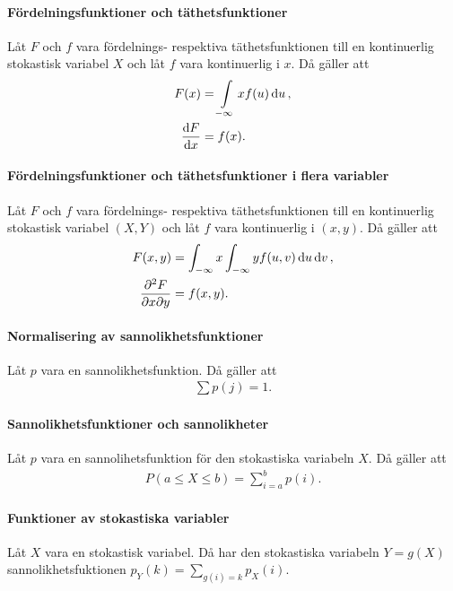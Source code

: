 \proof

\paragraph{Fördelningsfunktioner och täthetsfunktioner}
Låt $F$ och $f$ vara fördelnings- respektiva täthetsfunktionen till en kontinuerlig stokastisk variabel $X$ och låt $f$ vara kontinuerlig i $x$. Då gäller att
\begin{align*}
	F(x)          &= \int\limits_{-\infty}{x}f(u)\dd{u}, \\
	\dv{F}{x} (x) &= f(x).
\end{align*}

\paragraph{Fördelningsfunktioner och täthetsfunktioner i flera variabler}
Låt $F$ och $f$ vara fördelnings- respektiva täthetsfunktionen till en kontinuerlig stokastisk variabel $(X, Y)$ och låt $f$ vara kontinuerlig i $(x, y)$. Då gäller att
\begin{align*}
	F(x, y)          &= \int_{-\infty}{x}\int_{-\infty}{y}f(u, v)\dd{u}\dd{v}, \\
	\pdv{F}{x}{y} (x, y) &= f(x, y).
\end{align*}

\paragraph{Normalisering av sannolikhetsfunktioner}
Låt $p$ vara en sannolikhetsfunktion. Då gäller att
\begin{align*}
	\sum p(j) = 1.
\end{align*}

\proof

\paragraph{Sannolikhetsfunktioner och sannolikheter}
Låt $p$ vara en sannolihetsfunktion för den stokastiska variabeln $X$. Då gäller att
\begin{align*}
	P(a\leq X\leq b) = \sum\limits_{i = a}^{b}p(i).
\end{align*}

\proof

\paragraph{Funktioner av stokastiska variabler}
Låt $X$ vara en stokastisk variabel. Då har den stokastiska variabeln $Y = g(X)$ sannolikhetsfuktionen $p_{Y}(k) = \sum\limits_{g(i) = k}p_{X}(i)$.


